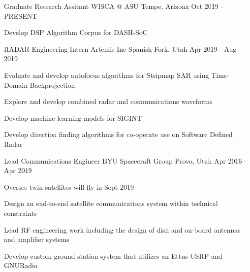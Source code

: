 

\begin{cventries}
    \cventry
    {Graduate Research Assitant} %
    {WISCA @ ASU} %
    {Tempe, Arizona} %
    {Oct 2019 - PRESENT} %
    {
        \begin{cvitems} %
        \item {Develop DSP Algorithm Corpus for DASH-SoC}
        \end{cvitems}
    }

    \cventry
    {RADAR Engineering Intern} %
    {Artemis Inc} %
    {Spanish Fork, Utah} %
    {Apr 2019 - Aug 2019} %
    {
        \begin{cvitems} %
        \item {Evaluate and develop autofocus algorithms for Stripmap SAR using Time-Domain Backprojection}
        \item {Explore and develop combined radar and communications waveforms}
        \item {Develop machine learning models for SIGINT}
        \item {Develop direction finding algorithms for co-operate use on Software Defined Radar}
        \end{cvitems}
    }

    \cventry
    {Lead Communications Engineer} %
    {BYU Spacecraft Group} %
    {Provo, Utah} %
    {Apr 2016 - Apr 2019} %
    {
        \begin{cvitems} %
        \item {Oversee twin satellites will fly in Sept 2019}
        \item {Design an end-to-end satellite communications system within technical constraints}
        \item {Lead RF engineering work including the design of dish and on-board antennas and amplifier systems}
        \item {Develop custom ground station system that utilizes an Ettus USRP and GNURadio}
        \end{cvitems}
    }


\end{cventries}
